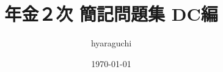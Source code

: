 \documentclass[10pt]{jsarticle}%
\begin{document}
\title{年金２次 \; 簡記問題集 \; DC編}
\author{hyaraguchi}
\date{\today}
\maketitle


\tableofcontents%

\newpage




























\begin{comment}
\newpage

\begin{thebibliography}{1}%
  \bibitem[過去問]{過去問} 公益社団法人 日本アクチュアリー会 資格試験過去問題集 \url{https://www.actuaries.jp/lib/collection/} (最終閲覧日：2023/12/10)
  \bibitem[教科書]{教科書} 日本アクチュアリー会『損保数理』(日本アクチュアリー会, 2011)
  \bibitem[モデリング]{モデリング} 日本アクチュアリー会『モデリング』(日本アクチュアリー会, 2005)
  \bibitem[リスク・セオリー]{リスク・セオリー} 岩沢宏和『リスク・セオリーの基礎』(培風館, 2010)
  \bibitem[アク数学シリーズ]{アク数学シリーズ} 岩沢宏和, 黒田耕嗣『アクチュアリー数学シリーズ4 損害保険数理』(日本評論社, 2015)
  \bibitem[ストラテジー]{ストラテジー} MAH, 平井卓也, 玉岡一史『アクチュアリー試験 合格へのストラテジー 損保数理』(東京図書, 2019)
  \bibitem[例題で学ぶ]{例題で学ぶ} 小暮雅一, 東出純『例題で学ぶ損害保険数理 第2版』(共立出版, 2016)
  \bibitem[難問題の系統]{難問題の系統}CAR他「難問題の系統とその解き方 損保数理」\url{}(最終閲覧日：2023/12/10)
  \bibitem[弱点克服]{弱点克服} 藤田岳彦『弱点克服 大学生の確率・統計』(東京図書, 2010)
  \bibitem[数研微積分]{数研微積分} 加藤文元『大学教養 微分積分』(数研出版, 2019)
\end{thebibliography}
\end{comment}
\end{document}
